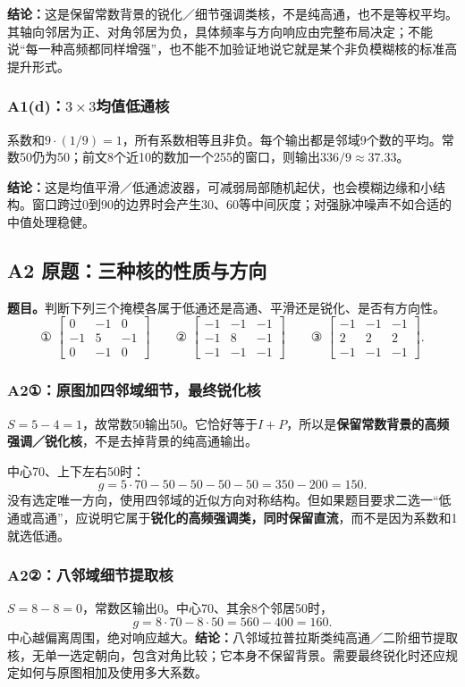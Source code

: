 \textbf{结论：}这是保留常数背景的锐化／细节强调类核，不是纯高通，也不是等权平均。其轴向邻居为正、对角邻居为负，具体频率与方向响应由完整布局决定；不能说“每一种高频都同样增强”，也不能不加验证地说它就是某个非负模糊核的标准高提升形式。

\subsubsection{A1(d)：$3\times3$均值低通核}
系数和$9\cdot(1/9)=1$，所有系数相等且非负。每个输出都是邻域9个数的平均。常数50仍为50；前文8个近10的数加一个255的窗口，则输出$336/9\approx37.33$。

\textbf{结论：}这是均值平滑／低通滤波器，可减弱局部随机起伏，也会模糊边缘和小结构。窗口跨过0到90的边界时会产生30、60等中间灰度；对强脉冲噪声不如合适的中值处理稳健。

\subsection{A2 原题：三种核的性质与方向}
\label{original:A2}
\textbf{题目。}判断下列三个掩模各属于低通还是高通、平滑还是锐化、是否有方向性。
\[
 \text{① }\begin{bmatrix}0&-1&0\\-1&5&-1\\0&-1&0\end{bmatrix}
 \qquad
 \text{② }\begin{bmatrix}-1&-1&-1\\-1&8&-1\\-1&-1&-1\end{bmatrix}
 \qquad
 \text{③ }\begin{bmatrix}-1&-1&-1\\2&2&2\\-1&-1&-1\end{bmatrix}.
\]

\subsubsection{A2①：原图加四邻域细节，最终锐化核}
$S=5-4=1$，故常数50输出50。它恰好等于$I+P$，所以是\textbf{保留常数背景的高频强调／锐化核}，不是去掉背景的纯高通输出。

中心70、上下左右50时：
\[
 g=5\cdot70-50-50-50-50=350-200=150.
\]
没有选定唯一方向，使用四邻域的近似方向对称结构。但如果题目要求二选一“低通或高通”，应说明它属于\textbf{锐化的高频强调类，同时保留直流}，而不是因为系数和1就选低通。

\subsubsection{A2②：八邻域细节提取核}
$S=8-8=0$，常数区输出0。中心70、其余8个邻居50时，
\[
 g=8\cdot70-8\cdot50=560-400=160.
\]
中心越偏离周围，绝对响应越大。\textbf{结论：}八邻域拉普拉斯类纯高通／二阶细节提取核，无单一选定朝向，包含对角比较；它本身不保留背景。需要最终锐化时还应规定如何与原图相加及使用多大系数。

